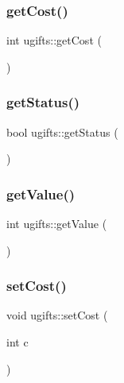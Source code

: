 \subsubsection{\texorpdfstring{get\+Cost()}{getCost()}}
{\footnotesize\ttfamily int ugifts\+::get\+Cost (\begin{DoxyParamCaption}{ }\end{DoxyParamCaption})}

\mbox{\label{classinfo_1_1ugifts_a0543d315e5e06b63577841de5669323e}} 
\subsubsection{\texorpdfstring{get\+Status()}{getStatus()}}
{\footnotesize\ttfamily bool ugifts\+::get\+Status (\begin{DoxyParamCaption}{ }\end{DoxyParamCaption})}

\mbox{\label{classinfo_1_1ugifts_ad9e27c3598db2e3497d398e5816b54a6}} 
\subsubsection{\texorpdfstring{get\+Value()}{getValue()}}
{\footnotesize\ttfamily int ugifts\+::get\+Value (\begin{DoxyParamCaption}{ }\end{DoxyParamCaption})}

\mbox{\label{classinfo_1_1ugifts_adac6549a1290e2c37f9cb772e26b5559}} 
\subsubsection{\texorpdfstring{set\+Cost()}{setCost()}}
{\footnotesize\ttfamily void ugifts\+::set\+Cost (\begin{DoxyParamCaption}\item[{int}]{c }\end{DoxyParamCaption})}

